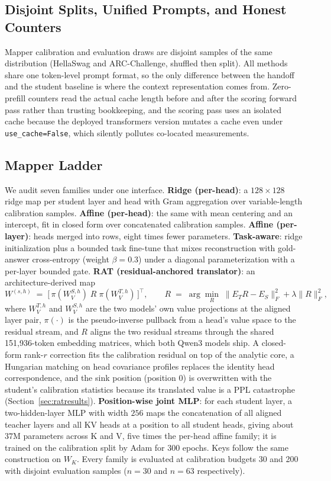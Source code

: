 \documentclass{article} %
\begin{document}
\subsection{Disjoint Splits, Unified Prompts, and Honest Counters}
Mapper calibration and evaluation draws are disjoint samples of the same
distribution (HellaSwag and ARC-Challenge, shuffled then split). All methods
share one token-level prompt format, so the only difference between the
handoff and the student baseline is where the context representation comes
from. Zero-prefill counters read the actual cache length before and after the
scoring forward pass rather than trusting bookkeeping, and the scoring pass
uses an isolated cache because the deployed transformers version mutates a
cache even under \texttt{use\_cache=False}, which silently pollutes
co-located measurements.

\subsection{Mapper Ladder}
We audit seven families under one interface. \textbf{Ridge (per-head)}: a
$128\times128$ ridge map per student layer and head with Gram aggregation
over variable-length calibration samples. \textbf{Affine (per-head)}: the
same with mean centering and an intercept, fit in closed form over
concatenated calibration samples. \textbf{Affine (per-layer)}: heads merged
into rows, eight times fewer parameters. \textbf{Task-aware}: ridge
initialization plus a bounded task fine-tune that mixes reconstruction with
gold-answer cross-entropy (weight $\beta{=}0.3$) under a diagonal
parameterization with a per-layer bounded gate. \textbf{RAT
(residual-anchored translator)}: an architecture-derived map
\begin{equation}
W^{(s,h)} \;=\; \bigl[\,\pi(W^{S,h}_V)\;R\;\pi(W^{T,h}_V)\,\bigr]^{\!\top},
\qquad
R \;=\; \arg\min_R \; \|E_T R - E_S\|_F^2 + \lambda \|R\|_F^2,
\end{equation}
where $W^{T,h}_V$ and $W^{S,h}_V$ are the two models' own value projections
at the aligned layer pair, $\pi(\cdot)$ is the pseudo-inverse pullback from a
head's value space to the residual stream, and $R$ aligns the two residual
streams through the shared 151{,}936-token embedding matrices, which both
Qwen3 models ship. A closed-form rank-$r$ correction fits the calibration
residual on top of the analytic core, a Hungarian matching on head covariance
profiles replaces the identity head correspondence, and the sink position
(position 0) is overwritten with the student's calibration statistics because
its translated value is a PPL catastrophe (Section~\ref{sec:ratresults}).
\textbf{Position-wise joint MLP}: for each student layer, a
two-hidden-layer MLP with width $256$ maps the concatenation of all aligned
teacher layers and all KV heads at a position to all student heads, giving
about $37$M parameters across K and V, five times the per-head affine family;
it is trained on the calibration split by Adam for $300$ epochs.
Keys follow the same construction on $W_K$. Every family is evaluated at
calibration budgets 30 and 200 with disjoint evaluation samples
($n{=}30$ and $n{=}63$ respectively).
\end{document}
